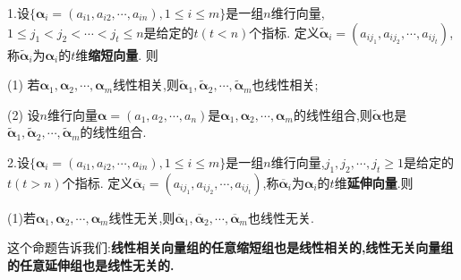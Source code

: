 \documentclass[../../main.tex]{subfiles}%
\begin{document}
\begin{proposition}[缩短向量与延伸向量]\label{proposition:线性相关向量组的缩短组也线性相关}
1.设\(\{\boldsymbol{\alpha}_i=(a_{i1},a_{i2},\cdots,a_{in}),1\leqslant  i\leqslant  m\}\)是一组\(n\)维行向量,\(1\leqslant  j_1<j_2<\cdots<j_t\leqslant  n\)是给定的\(t(t < n)\)个指标. 定义\(\widetilde{\boldsymbol{\alpha}}_i=(a_{ij_1},a_{ij_2},\cdots,a_{ij_t})\),称\(\widetilde{\boldsymbol{\alpha}}_i\)为\(\boldsymbol{\alpha}_i\)的\(t\)维\textbf{缩短向量}. 则

(1) 若\(\boldsymbol{\alpha}_1,\boldsymbol{\alpha}_2,\cdots,\boldsymbol{\alpha}_m\)线性相关,则\(\widetilde{\boldsymbol{\alpha}}_1,\widetilde{\boldsymbol{\alpha}}_2,\cdots,\widetilde{\boldsymbol{\alpha}}_m\)也线性相关;

(2) 设\(n\)维行向量\(\boldsymbol{\alpha}=(a_1,a_2,\cdots,a_n)\)是\(\boldsymbol{\alpha}_1,\boldsymbol{\alpha}_2,\cdots,\boldsymbol{\alpha}_m\)的线性组合,则\(\widetilde{\boldsymbol{\alpha}}\)也是\(\widetilde{\boldsymbol{\alpha}}_1,\widetilde{\boldsymbol{\alpha}}_2,\cdots,\widetilde{\boldsymbol{\alpha}}_m\)的线性组合.

2.设\(\{\boldsymbol{\alpha}_i=(a_{i1},a_{i2},\cdots,a_{in}),1\leqslant  i\leqslant  m\}\)是一组\(n\)维行向量,\(j_1,j_2,\cdots,j_t\geqslant  1\)是给定的\(t(t > n)\)个指标. 定义\(\overline{\boldsymbol{\alpha}}_i=(a_{ij_1},a_{ij_2},\cdots,a_{ij_t})\),称\(\overline{\boldsymbol{\alpha}}_i\)为\(\boldsymbol{\alpha}_i\)的\(t\)维\textbf{延伸向量}.则

(1)若\(\boldsymbol{\alpha}_1,\boldsymbol{\alpha}_2,\cdots,\boldsymbol{\alpha}_m\)线性无关,则\(\overline{\boldsymbol{\alpha}}_1,\overline{\boldsymbol{\alpha}}_2,\cdots,\overline{\boldsymbol{\alpha}}_m\)也线性无关.
\end{proposition}
\begin{note}
这个命题告诉我们:\textbf{线性相关向量组的任意缩短组也是线性相关的,线性无关向量组的任意延伸组也是线性无关的.}
\end{note}
\end{document}
